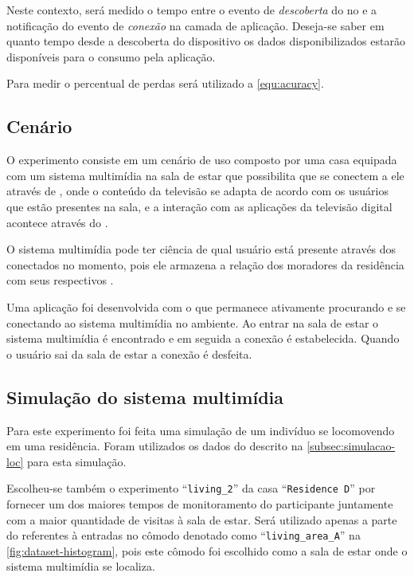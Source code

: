 Neste contexto, será medido o tempo entre o evento de \emph{descoberta} do \smartobj no \stwopa e a notificação do evento de \emph{conexão} na camada de aplicação.
Deseja-se saber em quanto tempo desde a descoberta do dispositivo os dados disponibilizados estarão disponíveis para o consumo pela aplicação.

Para medir o percentual de perdas será utilizado a \autoref{equ:acuracy}.

\subsection{Cenário}

O experimento consiste em um cenário de uso composto por uma casa equipada com um sistema multimídia na sala de estar que possibilita que \smartphones se conectem a ele através de \bluetooth, onde o conteúdo da televisão se adapta de acordo com os usuários que estão presentes na sala, e a interação com as aplicações da televisão digital acontece através do \smartphone.

O sistema multimídia pode ter ciência de qual usuário está presente através dos \smartphones conectados no momento, pois ele armazena a relação dos moradores da residência com seus respectivos \smartphones.


Uma aplicação \android foi desenvolvida com o \middleware \mhubcddl que permanece ativamente procurando e se conectando ao sistema multimídia no ambiente. Ao entrar na sala de estar o sistema multimídia é encontrado e em seguida a conexão é estabelecida. Quando o usuário sai da sala de estar a conexão é desfeita. 



\subsection{Simulação do sistema multimídia}

Para este experimento foi feita uma simulação de um indivíduo se locomovendo em uma residência. Foram utilizados os dados do \dataset descrito na \autoref{subsec:simulacao-loc} para esta simulação.

Escolheu-se também o experimento ``\texttt{living\_2}'' da casa ``\texttt{Residence D}'' por fornecer um dos maiores tempos de monitoramento do participante juntamente com a maior quantidade de visitas à sala de estar. Será utilizado apenas a parte do \dataset referentes à entradas no cômodo denotado como ``\texttt{living\_area\_A}'' na \autoref{fig:dataset-histogram}, pois este cômodo foi escolhido como a sala de estar onde o sistema multimídia se localiza.

